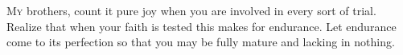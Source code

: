 
\lettrine{M}{y} brothers, count it pure joy when you are involved in every sort of trial. Realize that when your faith is tested this makes for endurance. Let endurance come to its perfection so that you may be fully mature and lacking in nothing.